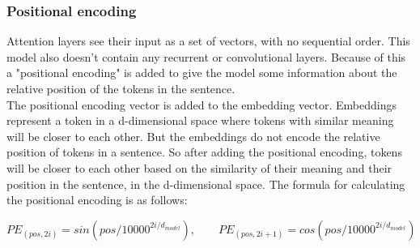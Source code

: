 \subsubsection{Positional encoding}

Attention layers see their input as a set of vectors, with no sequential order. This model also doesn't contain any recurrent or convolutional layers. Because of this a "positional encoding" is added to give the model some information about the relative position of the tokens in the sentence. \\
The positional encoding vector is added to the embedding vector. Embeddings represent a token in a d-dimensional space where tokens with similar meaning will be closer to each other. But the embeddings do not encode the relative position of tokens in a sentence. So after adding the positional encoding, tokens will be closer to each other based on the similarity of their meaning and their position in the sentence, in the d-dimensional space. The formula for calculating the positional encoding is as follows:

\[
    PE_{(pos, 2i)} = sin(pos/10000^{2i/d_{model}}), \qquad PE_{(pos, 2i+1)} = cos(pos/10000^{2i/d_{model}})
\]

